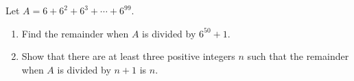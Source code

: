 Let $A=6+6^2+6^3+\cdots+6^{99}$.
\begin{enumerate}
\item[(a)] Find the remainder when $A$ is divided by $6^{50}+1$.
\item[(b)] Show that there are at least three positive integers $n$ such that the remainder when $A$ is divided by $n+1$ is $n$.
\end{enumerate}
